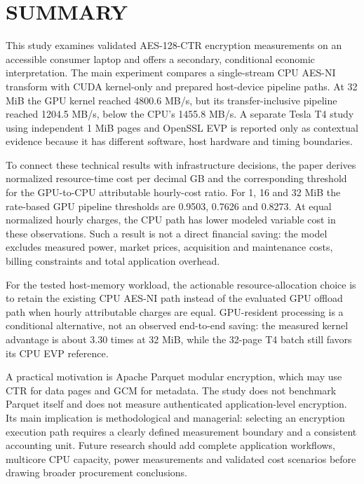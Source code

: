 \documentclass[11pt,b5paper]{article}
\begin{document}
\section*{SUMMARY}
This study examines validated AES-128-CTR encryption measurements on an accessible consumer laptop and offers a secondary, conditional economic interpretation. The main experiment compares a single-stream CPU AES-NI transform with CUDA kernel-only and prepared host-device pipeline paths. At 32 MiB the GPU kernel reached 4800.6 MB/s, but its transfer-inclusive pipeline reached 1204.5 MB/s, below the CPU's 1455.8 MB/s. A separate Tesla T4 study using independent 1 MiB pages and OpenSSL EVP is reported only as contextual evidence because it has different software, host hardware and timing boundaries.\par
To connect these technical results with infrastructure decisions, the paper derives normalized resource-time cost per decimal GB and the corresponding threshold for the GPU-to-CPU attributable hourly-cost ratio. For 1, 16 and 32 MiB the rate-based GPU pipeline thresholds are 0.9503, 0.7626 and 0.8273. At equal normalized hourly charges, the CPU path has lower modeled variable cost in these observations. Such a result is not a direct financial saving: the model excludes measured power, market prices, acquisition and maintenance costs, billing constraints and total application overhead.\par
For the tested host-memory workload, the actionable resource-allocation choice is to retain the existing CPU AES-NI path instead of the evaluated GPU offload path when hourly attributable charges are equal. GPU-resident processing is a conditional alternative, not an observed end-to-end saving: the measured kernel advantage is about 3.30 times at 32 MiB, while the 32-page T4 batch still favors its CPU EVP reference.\par
A practical motivation is Apache Parquet modular encryption, which may use CTR for data pages and GCM for metadata. The study does not benchmark Parquet itself and does not measure authenticated application-level encryption. Its main implication is methodological and managerial: selecting an encryption execution path requires a clearly defined measurement boundary and a consistent accounting unit. Future research should add complete application workflows, multicore CPU capacity, power measurements and validated cost scenarios before drawing broader procurement conclusions.
\end{document}
